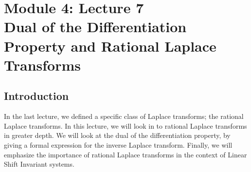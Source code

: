 \section{Module 4: Lecture 7\\Dual of the Differentiation Property and Rational Laplace Transforms}

\subsection{Introduction}
In the last lecture, we defined a specific class of Laplace transforms; the rational Laplace transforms. In this lecture, we will look in to rational Laplace transforms in greater depth. We will look at the dual of the differentiation property, by giving a formal expression for the inverse Laplace transform. Finally, we will emphasize the importance of rational Laplace transforms in the context of Linear Shift Invariant systems.
